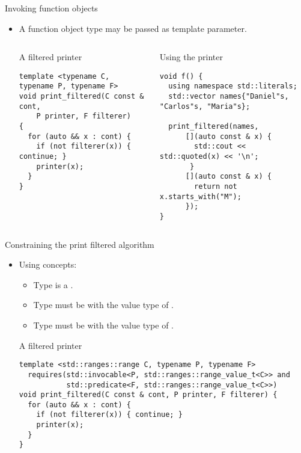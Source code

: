 \begin{frame}[t,fragile]{Invoking function objects}
\begin{itemize}
  \item A function object type may be passed as template parameter.
\begin{columns}[T]

\begin{block}{A filtered printer}
\begin{lstlisting}
template <typename C, typename P, typename F>
void print_filtered(C const & cont, 
    P printer, F filterer) 
{
  for (auto && x : cont) {
    if (not filterer(x)) { continue; }
    printer(x);
  }
}
\end{lstlisting}
\end{block}

\begin{block}{Using the printer}
\begin{lstlisting}
void f() {
  using namespace std::literals;
  std::vector names{"Daniel"s, "Carlos"s, "Maria"s};
  
  print_filtered(names,
      [](auto const & x) { 
        std::cout << std::quoted(x) << '\n';
       }
      [](auto const & x) {
        return not x.starts_with("M");
      });
}
\end{lstlisting}
\end{block}

\end{columns}

\end{itemize}
\end{frame}


\begin{frame}[t,fragile]{Constraining the print filtered algorithm}
\begin{itemize}
  \item Using concepts:
    \begin{itemize}
      \item Type  is a .
      \item Type  must be  with the value type of .
      \item Type  must be  with the value type of .
    \end{itemize}

\begin{block}{A filtered printer}
\begin{lstlisting}
template <std::ranges::range C, typename P, typename F>
  requires(std::invocable<P, std::ranges::range_value_t<C>> and
           std::predicate<F, std::ranges::range_value_t<C>>)
void print_filtered(C const & cont, P printer, F filterer) {
  for (auto && x : cont) {
    if (not filterer(x)) { continue; }
    printer(x);
  }
}
\end{lstlisting}
\end{block}

\end{itemize}
\end{frame}



